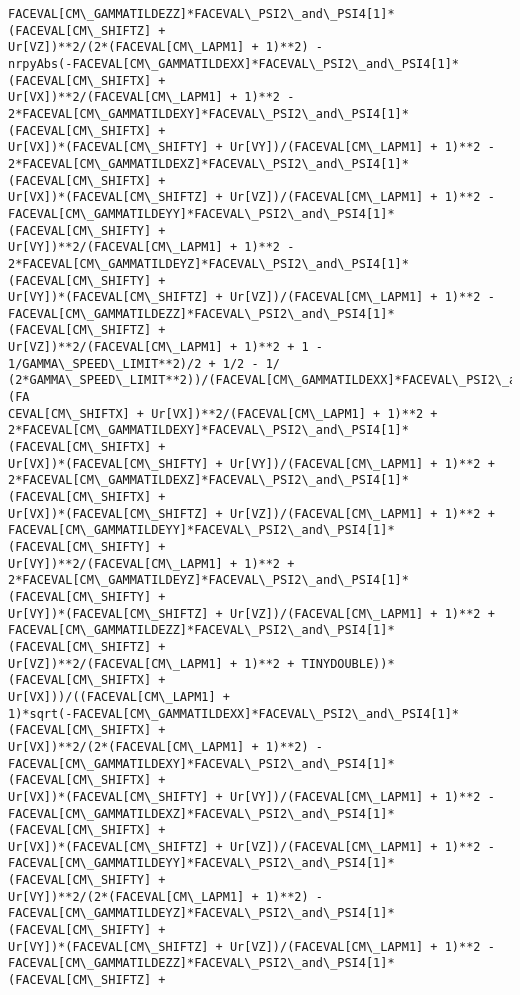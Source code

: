 \documentclass[landscape,letterpaper,10pt,english]{article}
\begin{document}
\begin{Verbatim}[commandchars=\\\{\}]
FACEVAL[CM\_GAMMATILDEZZ]*FACEVAL\_PSI2\_and\_PSI4[1]*(FACEVAL[CM\_SHIFTZ] +
Ur[VZ])**2/(2*(FACEVAL[CM\_LAPM1] + 1)**2) -
nrpyAbs(-FACEVAL[CM\_GAMMATILDEXX]*FACEVAL\_PSI2\_and\_PSI4[1]*(FACEVAL[CM\_SHIFTX] +
Ur[VX])**2/(FACEVAL[CM\_LAPM1] + 1)**2 -
2*FACEVAL[CM\_GAMMATILDEXY]*FACEVAL\_PSI2\_and\_PSI4[1]*(FACEVAL[CM\_SHIFTX] +
Ur[VX])*(FACEVAL[CM\_SHIFTY] + Ur[VY])/(FACEVAL[CM\_LAPM1] + 1)**2 -
2*FACEVAL[CM\_GAMMATILDEXZ]*FACEVAL\_PSI2\_and\_PSI4[1]*(FACEVAL[CM\_SHIFTX] +
Ur[VX])*(FACEVAL[CM\_SHIFTZ] + Ur[VZ])/(FACEVAL[CM\_LAPM1] + 1)**2 -
FACEVAL[CM\_GAMMATILDEYY]*FACEVAL\_PSI2\_and\_PSI4[1]*(FACEVAL[CM\_SHIFTY] +
Ur[VY])**2/(FACEVAL[CM\_LAPM1] + 1)**2 -
2*FACEVAL[CM\_GAMMATILDEYZ]*FACEVAL\_PSI2\_and\_PSI4[1]*(FACEVAL[CM\_SHIFTY] +
Ur[VY])*(FACEVAL[CM\_SHIFTZ] + Ur[VZ])/(FACEVAL[CM\_LAPM1] + 1)**2 -
FACEVAL[CM\_GAMMATILDEZZ]*FACEVAL\_PSI2\_and\_PSI4[1]*(FACEVAL[CM\_SHIFTZ] +
Ur[VZ])**2/(FACEVAL[CM\_LAPM1] + 1)**2 + 1 - 1/GAMMA\_SPEED\_LIMIT**2)/2 + 1/2 - 1/
(2*GAMMA\_SPEED\_LIMIT**2))/(FACEVAL[CM\_GAMMATILDEXX]*FACEVAL\_PSI2\_and\_PSI4[1]*(FA
CEVAL[CM\_SHIFTX] + Ur[VX])**2/(FACEVAL[CM\_LAPM1] + 1)**2 +
2*FACEVAL[CM\_GAMMATILDEXY]*FACEVAL\_PSI2\_and\_PSI4[1]*(FACEVAL[CM\_SHIFTX] +
Ur[VX])*(FACEVAL[CM\_SHIFTY] + Ur[VY])/(FACEVAL[CM\_LAPM1] + 1)**2 +
2*FACEVAL[CM\_GAMMATILDEXZ]*FACEVAL\_PSI2\_and\_PSI4[1]*(FACEVAL[CM\_SHIFTX] +
Ur[VX])*(FACEVAL[CM\_SHIFTZ] + Ur[VZ])/(FACEVAL[CM\_LAPM1] + 1)**2 +
FACEVAL[CM\_GAMMATILDEYY]*FACEVAL\_PSI2\_and\_PSI4[1]*(FACEVAL[CM\_SHIFTY] +
Ur[VY])**2/(FACEVAL[CM\_LAPM1] + 1)**2 +
2*FACEVAL[CM\_GAMMATILDEYZ]*FACEVAL\_PSI2\_and\_PSI4[1]*(FACEVAL[CM\_SHIFTY] +
Ur[VY])*(FACEVAL[CM\_SHIFTZ] + Ur[VZ])/(FACEVAL[CM\_LAPM1] + 1)**2 +
FACEVAL[CM\_GAMMATILDEZZ]*FACEVAL\_PSI2\_and\_PSI4[1]*(FACEVAL[CM\_SHIFTZ] +
Ur[VZ])**2/(FACEVAL[CM\_LAPM1] + 1)**2 + TINYDOUBLE))*(FACEVAL[CM\_SHIFTX] +
Ur[VX]))/((FACEVAL[CM\_LAPM1] +
1)*sqrt(-FACEVAL[CM\_GAMMATILDEXX]*FACEVAL\_PSI2\_and\_PSI4[1]*(FACEVAL[CM\_SHIFTX] +
Ur[VX])**2/(2*(FACEVAL[CM\_LAPM1] + 1)**2) -
FACEVAL[CM\_GAMMATILDEXY]*FACEVAL\_PSI2\_and\_PSI4[1]*(FACEVAL[CM\_SHIFTX] +
Ur[VX])*(FACEVAL[CM\_SHIFTY] + Ur[VY])/(FACEVAL[CM\_LAPM1] + 1)**2 -
FACEVAL[CM\_GAMMATILDEXZ]*FACEVAL\_PSI2\_and\_PSI4[1]*(FACEVAL[CM\_SHIFTX] +
Ur[VX])*(FACEVAL[CM\_SHIFTZ] + Ur[VZ])/(FACEVAL[CM\_LAPM1] + 1)**2 -
FACEVAL[CM\_GAMMATILDEYY]*FACEVAL\_PSI2\_and\_PSI4[1]*(FACEVAL[CM\_SHIFTY] +
Ur[VY])**2/(2*(FACEVAL[CM\_LAPM1] + 1)**2) -
FACEVAL[CM\_GAMMATILDEYZ]*FACEVAL\_PSI2\_and\_PSI4[1]*(FACEVAL[CM\_SHIFTY] +
Ur[VY])*(FACEVAL[CM\_SHIFTZ] + Ur[VZ])/(FACEVAL[CM\_LAPM1] + 1)**2 -
FACEVAL[CM\_GAMMATILDEZZ]*FACEVAL\_PSI2\_and\_PSI4[1]*(FACEVAL[CM\_SHIFTZ] +

\end{Verbatim}
\end{document}
